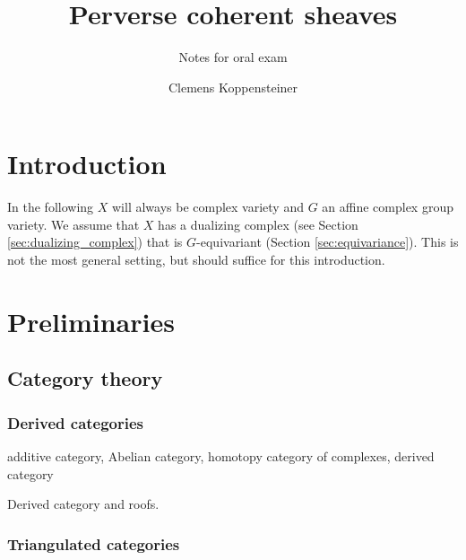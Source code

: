 \documentclass[english]{short-notes}
\title{Perverse coherent sheaves}
\subtitle{Notes for oral exam}
\author{Clemens Koppensteiner}
\begin{document}
\renewcommand\top{\mathrm{top}}
\renewcommand\dual{\mathbb D}

\maketitle

\tableofcontents

\section{Introduction}

In the following $X$ will always be complex variety and $G$ an affine complex group variety.
We assume that $X$ has a dualizing complex (see Section \ref{sec:dualizing_complex}) that is $G$-equivariant (Section \ref{sec:equivariance}).
This is not the most general setting, but should suffice for this introduction.

\section{Preliminaries}

\subsection{Category theory}

\subsubsection{Derived categories}\label{sec:derived_categories}

\begin{Def}
    additive category,
    Abelian category,
    homotopy category of complexes,
    derived category
\end{Def}

Derived category and roofs.

\subsubsection{Triangulated categories}\label{sec:triangulated_categories}
\end{document}
